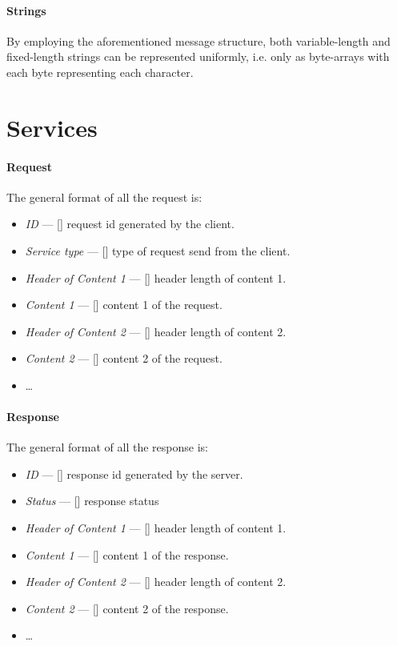 \documentclass[12pt]{article}
\begin{document}
\paragraph{Strings}
By employing the aforementioned message structure, both variable-length and fixed-length strings can be represented uniformly, i.e. only as byte-arrays with each byte representing each character.

\pagebreak
\section{Services}
\label{services}

\paragraph{Request}
The general format of all the request is:
\begin{itemize}
	\item \textit{ID} --- [] request id generated by the client.
    \item \textit{Service type} --- [] type of request send from the client.
    \item \textit{Header of Content 1} --- [] header length of content 1.
    \item \textit{Content 1} --- [] content 1 of the request.
    \item \textit{Header of Content 2} --- [] header length of content 2.
    \item \textit{Content 2} --- [] content 2 of the request.
    \item \dots
\end{itemize}

\paragraph{Response}
The general format of all the response is:
\begin{itemize}
	\item \textit{ID} --- [] response id generated by the server.
    \item \textit{Status} --- [] response status
    \item \textit{Header of Content 1} --- [] header length of content 1.
    \item \textit{Content 1} --- [] content 1 of the response.
    \item \textit{Header of Content 2} --- [] header length of content 2.
    \item \textit{Content 2} --- [] content 2 of the response.
    \item \dots
\end{itemize}
\end{document}

